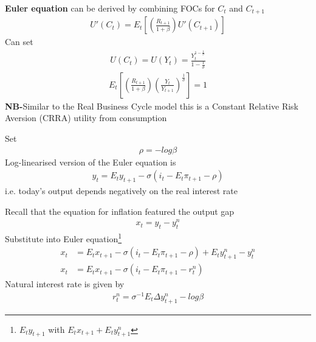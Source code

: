 \documentclass{beamer}
\begin{document}
\begin{frame}
  \textbf{Euler equation} can be derived by combining FOCs for $C_t$ and $C_{t+1}$ 
\begin{align}  
  U'(C_t) = E_t \left[ \left(\frac{R_{t+1}}{1+\beta} \right) U'(C_{t+1})\right] 
  \end{align}
  Can set
  \begin{align}
    U(C_t)=U(Y_t)=\frac{Y_t^{1-\frac{1}{\sigma}}}{1-\frac{1}{\sigma}}
  \end{align}
  \begin{align}
  E_t \left[ \left( \frac{R_{t+1}}{1+\beta} \right) \left( \frac{Y_t}{Y_{t+1}} \right)^{\frac{1}{\sigma}} \right]=1 
 \end{align}
 \textbf{NB-}Similar to the Real Business Cycle model this is a Constant Relative Risk Aversion (CRRA) utility from consumption
\end{frame}

\begin{frame}
  Set 
  \begin{align}
    \rho=-log\beta
  \end{align}
Log-linearised version of the Euler equation is 
\begin{align}  
y_t=E_ty_{t+1} - \sigma(i_t - E_t\pi_{t+1} - \rho) 
\end{align}
i.e. today's output depends negatively on the real interest rate
\end{frame}



\begin{frame}
  Recall that the equation for inflation featured the output gap 
  \begin{align}
    x_t=y_t-y_t^n  
  \end{align}
  Substitute into Euler equation\footnote{$E_ty_{t+1}$ with $E_tx_{t+1}+E_ty^n_{t+1}$}
\begin{align}
  x_t &= E_t x_{t+1} - \sigma (i_t - E_t \pi_{t+1} - \rho) + E_t y_{t+1}^n - y_t^n\\
  x_t &= E_t x_{t+1} - \sigma (i_t - E_t \pi_{t+1} - r_t^n)
\end{align}
Natural interest rate is given by
\begin{align}
  r_t^n=\sigma^{-1}E_t\Delta y_{t+1}^n - log \beta  
\end{align}
\end{frame}
\end{document}
